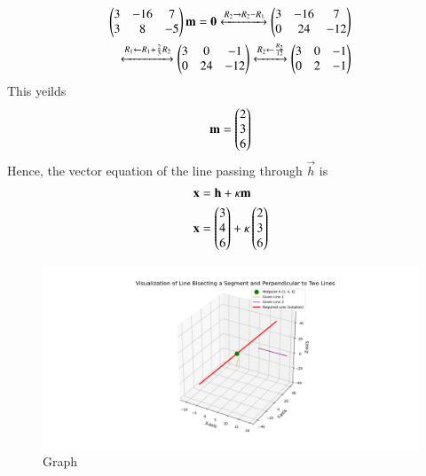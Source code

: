 \documentclass[journal]{IEEEtran}
\begin{document}
\begin{align}
    \begin{pmatrix}3 & -16 & 7 \\ 3 & 8 & -5\end{pmatrix}\mathbf{m} = \mathbf{0} \xleftrightarrow[]
    {R_2\rightarrow R_2 - R_1} \begin{pmatrix}3 & -16 & 7 \\ 0 & 24 & -12\end{pmatrix}\\ 
    \xleftrightarrow[]{R_1\leftarrow R_1 + \frac{2}{3}R_2} \begin{pmatrix}3 & 0 & -1 \\ 0 & 24 & -12\end{pmatrix} \xleftrightarrow[]{R_2\leftarrow \frac{R_2}{12}}\begin{pmatrix}3 & 0 & -1 \\ 0 & 2 & -1\end{pmatrix}
\end{align}
This yeilds
\begin{align}
    \mathbf{m} = \begin{pmatrix}2 \\ 3 \\ 6\end{pmatrix}
\end{align}
Hence, the vector equation of the line passing through $\vec{h}$ is 
\begin{align}
    \mathbf{x} &= \mathbf{h} + \kappa \mathbf{m}\\
    \mathbf{x} &= \begin{pmatrix}3 \\ 4 \\ 6\end{pmatrix} + \kappa \begin{pmatrix}2 \\ 3 \\ 6\end{pmatrix}
\end{align}

\begin{figure}[h]
    \centering
    \includegraphics[width=\columnwidth]{figs/figure_py.png}
    \caption{Graph}
    \label{fig:fig}
 \end{figure}
\end{document}
